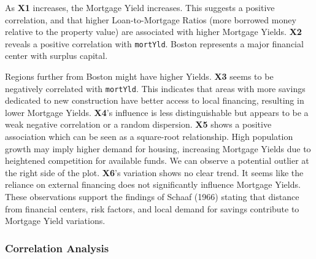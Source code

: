 \documentclass[
  11pt,
]{article}
\begin{document}
As \textbf{X1} increases, the Mortgage Yield increases. This suggests a
positive correlation, and that higher Loan-to-Mortgage Ratios (more
borrowed money relative to the property value) are associated with
higher Mortgage Yields. \textbf{X2} reveals a positive correlation with
\texttt{mortYld}. Boston represents a major financial center with
surplus capital.

Regions further from Boston might have higher Yields. \textbf{X3} seems
to be negatively correlated with \texttt{mortYld}. This indicates that
areas with more savings dedicated to new construction have better access
to local financing, resulting in lower Mortgage Yields. \textbf{X4}'s
influence is less distinguishable but appears to be a weak negative
correlation or a random dispersion. \textbf{X5} shows a positive
association which can be seen as a square-root relationship. High
population growth may imply higher demand for housing, increasing
Mortgage Yields due to heightened competition for available funds. We
can observe a potential outlier at the right side of the plot.
\textbf{X6}'s variation shows no clear trend. It seems like the reliance
on external financing does not significantly influence Mortgage
Yields.\\
These observations support the findings of Schaaf (1966) stating that
distance from financial centers, risk factors, and local demand for
savings contribute to Mortgage Yield variations. \vspace{-3pt}

\subsubsection{Correlation Analysis}\label{correlation-analysis}

\vspace{-10pt}
\end{document}
